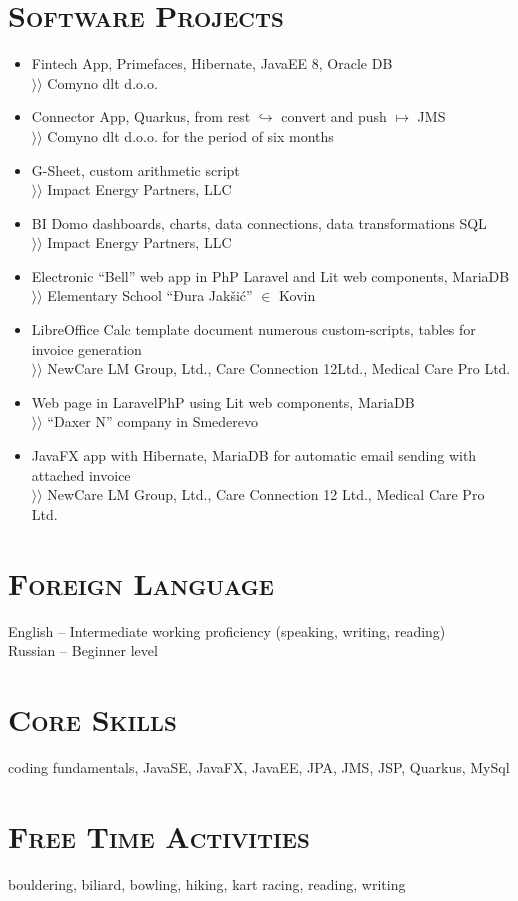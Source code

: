 \documentclass{article}
\begin{document}
\section{\textsc{Software Projects}}

\begin{itemize}
\item  Fintech App, Primefaces, Hibernate, JavaEE 8, Oracle DB\\
$\rangle\!\rangle$ Comyno dlt d.o.o.
\item Connector App, Quarkus, from rest $\hookrightarrow$ convert and push $\mapsto$ JMS\\
$\rangle\!\rangle$ Comyno dlt d.o.o. for the period of six months
\item G-Sheet, custom arithmetic script\\
$\rangle\!\rangle$ Impact Energy Partners, LLC
\item BI Domo dashboards, charts, data connections, data transformations SQL\\
$\rangle\!\rangle$ Impact Energy Partners, LLC
\item Electronic ``Bell'' web app in PhP Laravel and Lit web components, MariaDB\\
$\rangle\!\rangle$ Elementary School ``Đura Jakšić''  $\in$ Kovin
\item LibreOffice Calc template document numerous custom-scripts, tables for invoice generation\\ 
$\rangle\!\rangle$ NewCare LM Group, Ltd., Care Connection 12Ltd., Medical Care Pro Ltd.
\item Web page in LaravelPhP using Lit web components, MariaDB\\
$\rangle\!\rangle$ ``Daxer N'' company in Smederevo
\item JavaFX app with Hibernate, MariaDB for automatic email sending with attached invoice\\
$\rangle\!\rangle$ NewCare LM Group, Ltd., Care Connection 12 Ltd., Medical Care Pro Ltd.
\end{itemize}

\section{\textsc{Foreign Language}}

English  -- Intermediate working proficiency (speaking, writing, reading)\\
Russian -- Beginner level

\section{\textsc{Core Skills}}

coding fundamentals, JavaSE, JavaFX, JavaEE, JPA, JMS, JSP,  Quarkus, MySql

\section{\textsc{Free Time Activities}}

bouldering, biliard, bowling, hiking, kart racing, reading, writing
\end{document}
